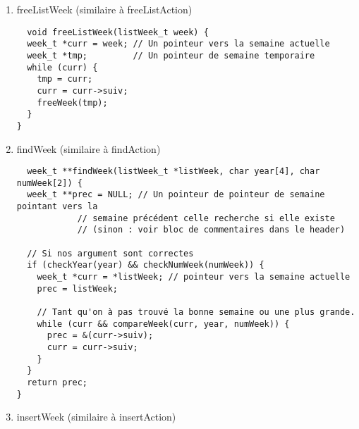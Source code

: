 \documentclass[11pt]{article}
\begin{document}
\begin{enumerate}
\begin{lstlisting}
\end{lstlisting}


\item freeListWeek (similaire à freeListAction)
\label{sec:org6c18c3e}

\begin{lstlisting}
  void freeListWeek(listWeek_t week) {
  week_t *curr = week; // Un pointeur vers la semaine actuelle
  week_t *tmp;         // Un pointeur de semaine temporaire
  while (curr) {
    tmp = curr;
    curr = curr->suiv;
    freeWeek(tmp);
  }
}
\end{lstlisting}


\item findWeek (similaire à findAction)
\label{sec:orgc5c7b17}

\begin{lstlisting}
  week_t **findWeek(listWeek_t *listWeek, char year[4], char numWeek[2]) {
  week_t **prec = NULL; // Un pointeur de pointeur de semaine pointant vers la
			// semaine précédent celle recherche si elle existe
			// (sinon : voir bloc de commentaires dans le header)

  // Si nos argument sont correctes
  if (checkYear(year) && checkNumWeek(numWeek)) {
    week_t *curr = *listWeek; // pointeur vers la semaine actuelle
    prec = listWeek;

    // Tant qu'on à pas trouvé la bonne semaine ou une plus grande.
    while (curr && compareWeek(curr, year, numWeek)) {
      prec = &(curr->suiv);
      curr = curr->suiv;
    }
  }
  return prec;
}
\end{lstlisting}


\item insertWeek (similaire à insertAction)
\label{sec:org799e3e3}


\end{enumerate}
\end{document}
